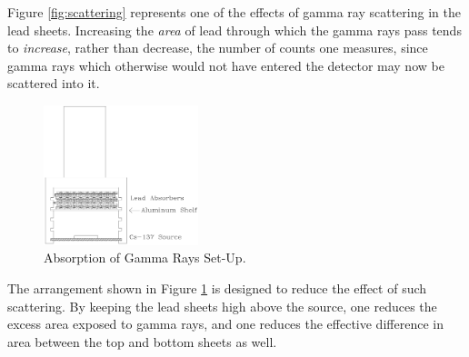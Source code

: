 Figure {\ref{fig:scattering}} represents one of the effects of gamma ray scattering in the lead sheets. Increasing the \emph{area} of lead through which the gamma rays pass tends to \emph{increase}, rather than decrease, the number of counts one measures, since gamma rays which otherwise would not have entered the detector may now be scattered into it.\myskip
\begin{figure}[h]
\centering
\includegraphics[width=0.4\textwidth]{./Exp10/pic/image11.png}
\caption{Absorption of Gamma Rays Set-Up.}
\label{fig:gammarays}
\end{figure}

The arrangement shown in Figure {\ref{fig:gammarays}} is designed to reduce the effect of such scattering. By keeping the lead sheets high above the source, one reduces the excess area exposed to gamma rays, and one reduces the effective difference in area between the top and bottom sheets as well.\myskip

